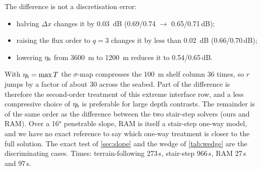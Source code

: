 The difference is not a discretisation error:
\begin{itemize}
\item halving $\Delta x$ changes it by \SI{0.03}{dB} (0.69/0.74 $\to$ 0.65/0.71\,dB);
\item raising the flux order to $q=3$ changes it by less than \SI{0.02}{dB} (0.66/0.70\,dB);
\item lowering $\eta_{b}$ from \SI{3600}{m} to \SI{1200}{m} reduces it to 0.54/0.65\,dB.
\end{itemize}
With $\eta_{b}=\max T$ the $\sigma$-map compresses the \SI{100}{m} shelf column 36 times, so $r$ jumps by a factor of about 30 across the seabed. Part of the
difference is therefore the second-order treatment of this extreme interface
row, and a less compressive choice of $\eta_{b}$ is preferable for large depth
contrasts. The remainder is of the same order as the difference between the two
stair-step solvers (ours and RAM). Over a \ang{16} penetrable slope, RAM is
itself a stair-step one-way model, and we have no exact reference to say which
one-way treatment is closer to the full solution. The exact test of
\cref{sec:slope} and the wedge of \cref{tab:wedge} are the discriminating
cases.
Times: terrain-following 273\,s, stair-step 966\,s, RAM
27\,s and 97\,s.
